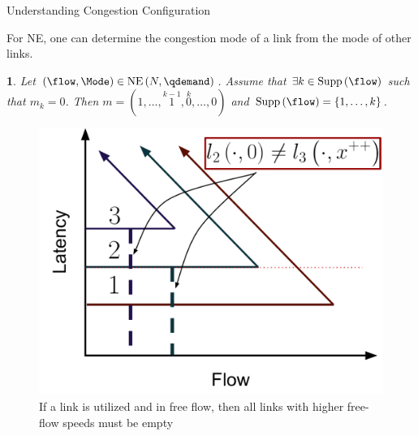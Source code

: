 \documentclass[english, smaller]{beamer}
\theoremstyle{plain}
\theoremstyle{definition}
\theoremstyle{plain}
\theoremstyle{plain}
\newtheorem{cor}[thm]{\protect\corollaryname}
\providecommand{\corollaryname}{Corollary}
\begin{document}
\begin{frame}{Understanding Congestion Configuration}

For NE, one can determine the congestion mode of a link from the mode
of other links.
\begin{cor}
Let $\left(\flow,\Mode\right)\in\NashEquilibrium{\NLinks}{\qdemand}$.
Assume that $\exists k\in\Supp{\flow}$ such that $m_{k}=0$. Then
$m=(1,\dots,\stackrel{k-1}{1},\stackrel{k}{0},\dots,0)$ and $\Supp{\flow}=\left\{ 1,\dots,k\right\} $.
\end{cor}
\begin{figure}
\begin{centering}
\includegraphics[scale=0.25]{../../figures/presentation/CorollaryAllaboveFFareempty}
\par\end{centering}

\caption{If a link is utilized and in free flow, then all links with higher
free-flow speeds must be empty}
\end{figure}



\end{frame}
\end{document}
